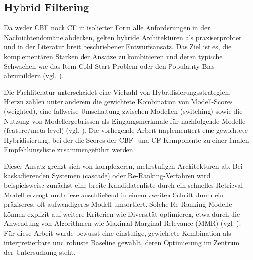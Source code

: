 \subsection{Hybrid Filtering}
\label{sec:hybrid}
Da weder \ac{CBF} noch \ac{CF} in isolierter Form alle Anforderungen in der Nachrichtendomäne abdecken, 
gelten hybride Architekturen als praxiserprobter und in der Literatur breit beschriebener Entwurfsansatz. 
Das Ziel ist es, die komplementären Stärken der Ansätze zu kombinieren und deren typische Schwächen 
wie das Item-Cold-Start-Problem oder den Popularity Bias abzumildern 
(vgl. \cite{burke_hybrid_2002,wu_personalized_2022,raza_news_2020}).

Die Fachliteratur unterscheidet eine Vielzahl von Hybridisierungsstrategien. Hierzu zählen unter anderem 
die gewichtete Kombination von Modell-Scores (weighted), eine fallweise Umschaltung zwischen Modellen 
(switching) sowie die Nutzung von Modellergebnissen als Eingangsmerkmale für nachfolgende Modelle 
(feature/meta-level) (vgl. \cite{burke_hybrid_2002}). 
Die vorliegende Arbeit implementiert eine gewichtete Hybridisierung, bei der die Scores der 
\ac{CBF}- und \ac{CF}-Komponente zu einer finalen Empfehlungsliste zusammengeführt werden.

Dieser Ansatz grenzt sich von komplexeren, mehrstufigen Architekturen ab. Bei kaskadierenden 
Systemen (cascade) oder Re-Ranking-Verfahren wird beispielsweise zunächst eine breite Kandidatenliste 
durch ein schnelles Retrieval-Modell erzeugt und diese anschließend in einem zweiten Schritt durch 
ein präziseres, oft aufwendigeres Modell umsortiert. Solche Re-Ranking-Modelle können explizit auf 
weitere Kriterien wie Diversität optimieren, etwa durch die Anwendung von Algorithmen wie 
Maximal Marginal Relevance (MMR) (vgl. \cite{Carbonell_mmr_1998}). Für diese Arbeit wurde bewusst 
eine einstufige, gewichtete Kombination als interpretierbare und robuste Baseline gewählt, deren 
Optimierung im Zentrum der Untersuchung steht.



